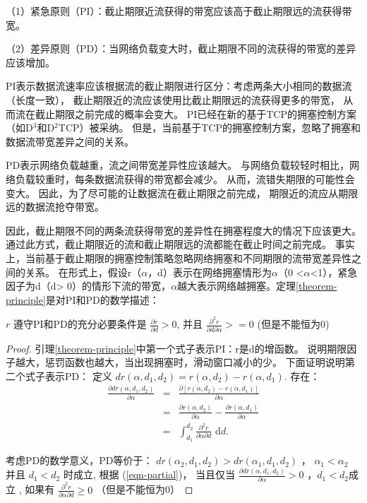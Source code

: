 （1）紧急原则（PI）：截止期限近流获得的带宽应该高于截止期限远的流获得带宽。

（2）差异原则（PD）：当网络负载变大时，截止期限不同的流获得的带宽的差异应该增加。 


PI表示数据流速率应该根据流的截止期限进行区分：考虑两条大小相同的数据流（长度一致），
截止期限近的流应该使用比截止期限远的流获得更多的带宽，
从而流在截止期限之前完成的概率会变大。
PI已经在新的基于TCP的拥塞控制方案（如D$^3$和D$^2$TCP）被采纳。
但是，当前基于TCP的拥塞控制方案，忽略了拥塞和数据流带宽差异之间的关系。


PD表示网络负载越重，流之间带宽差异性应该越大。
与网络负载较轻时相比，网络负载较重时，每条数据流获得的带宽都会减少。
从而，流错失期限的可能性会变大。 
因此，为了尽可能的让数据流在截止期限之前完成，
期限近的流应从期限远的数据流抢夺带宽。
 
因此，截止期限不同的两条流获得带宽的差异性在拥塞程度大的情况下应该更大。
通过此方式，截止期限近的流和截止期限远的流都能在截止时间之前完成。
事实上，当前基于截止期限的拥塞控制策略忽略网络拥塞和不同期限的流带宽差异性之间的关系。
在形式上，假设r（$\alpha$，d）表示在网络拥塞情形为$\alpha$（0 <$\alpha$<1），紧急因子为d（d> 0）的情形下流的带宽，$\alpha$越大表示网络越拥塞。定理\ref{theorem-principle}是对PI和PD的数学描述：

\begin{lemma}\label{theorem-principle}
 $r$ 遵守PI和PD的充分必要条件是 $\frac{\partial{r}}{\partial{d}}>0$, 
并且 $\frac{\partial^{2}{r}}{\partial{d}\partial{\alpha}}>=0$ 
(但是不能恒为0)

\end{lemma}


\begin{proof}
引理\ref{theorem-principle}中第一个式子表示PI：r是d的增函数。
说明期限因子越大，惩罚函数也越大，当出现拥塞时，滑动窗口减小的少。
下面证明说明第二个式子表示PD：
定义 $dr(\alpha, d_{1}, d_{2})=r(\alpha, d_{2})-r(\alpha, d_{1})$.
存在：
\begin{eqnarray}\label{eqn-partial}
\frac{\partial{dr(\alpha, d_{1}, d_{2})}}{\partial{\alpha}}
&=&\frac{\partial \left[r(\alpha, d_{2})-r(\alpha, d_{1}) \right]}{\partial{\alpha}} \nonumber \\
&=&\frac{\partial{r(\alpha, d_{2})}}{\partial{\alpha}} - 
\frac{\partial{r(\alpha, d_{1})}}{\partial{\alpha}}
\nonumber \\
&=& \int_{d_{1}}^{d_{2}}\!\!\frac{\partial^{2}{r}}{\partial{\alpha}\partial{d}} \,\,\mathrm{d}d.
\end{eqnarray}

考虑PD的数学意义，PD等价于： 
$dr(\alpha_{2}, d_{1}, d_{2})>dr(\alpha_{1}, d_{1}, d_{2})$
， $\alpha_{1}<\alpha_{2}$ 并且 $d_{1}<d_{2}$ 时成立, 
根据 (\ref{eqn-partial})，
当且仅当
$\frac{\partial{dr(\alpha, d_{1}, d_{2})}}{\partial{\alpha}}>0$
，$d_{1} < d_{2}$成立
, 如果有
$\frac{\partial^{2}{r}}{\partial{\alpha}\partial{d}} \ge 0$ （但是不能恒为0）
\end{proof}

